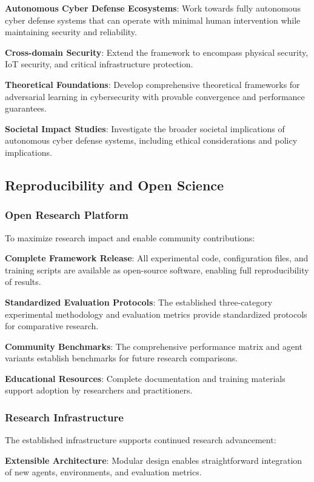 \documentclass[12pt,twoside]{article}
\theoremstyle{definition}
\theoremstyle{plain}
\begin{document}
\textbf{Autonomous Cyber Defense Ecosystems}: Work towards fully autonomous cyber defense systems that can operate with minimal human intervention while maintaining security and reliability.

\textbf{Cross-domain Security}: Extend the framework to encompass physical security, IoT security, and critical infrastructure protection.

\textbf{Theoretical Foundations}: Develop comprehensive theoretical frameworks for adversarial learning in cybersecurity with provable convergence and performance guarantees.

\textbf{Societal Impact Studies}: Investigate the broader societal implications of autonomous cyber defense systems, including ethical considerations and policy implications.

\subsection{Reproducibility and Open Science}

\subsubsection{Open Research Platform}
To maximize research impact and enable community contributions:

\textbf{Complete Framework Release}: All experimental code, configuration files, and training scripts are available as open-source software, enabling full reproducibility of results.

\textbf{Standardized Evaluation Protocols}: The established three-category experimental methodology and evaluation metrics provide standardized protocols for comparative research.

\textbf{Community Benchmarks}: The comprehensive performance matrix and agent variants establish benchmarks for future research comparisons.

\textbf{Educational Resources}: Complete documentation and training materials support adoption by researchers and practitioners.

\subsubsection{Research Infrastructure}
The established infrastructure supports continued research advancement:

\textbf{Extensible Architecture}: Modular design enables straightforward integration of new agents, environments, and evaluation metrics.
\end{document}
